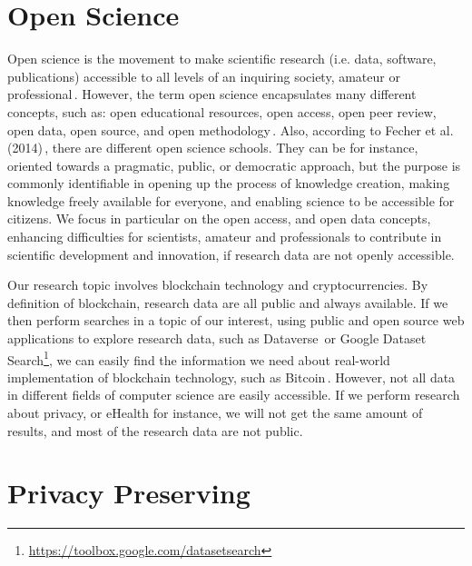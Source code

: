 
\section{Open Science}
Open science is the movement to make scientific research (i.e. data, software, publications)
accessible to all levels of an inquiring society, amateur or professional\,\cite{woelfle2011openscience}.
However, the term open science encapsulates many different concepts, such as: open educational resources,
open access, open peer review, open data, open source, and open methodology\,\cite{Knoth2015}.
%
Also, according to Fecher et al. (2014)\,\cite{Fecher2014}, there are different open science schools.
They can be for instance, oriented towards a pragmatic, public, or democratic approach, but
the purpose is commonly identifiable in opening up the process of knowledge creation,
making knowledge freely available for everyone, and enabling science to be accessible for citizens.
%
We focus in particular on the open access, and open data concepts, enhancing difficulties for
scientists, amateur and professionals to contribute in scientific development and innovation, if research data are not
openly accessible.

Our research topic involves blockchain technology and cryptocurrencies.
By definition of blockchain, research data are all
public and always available. If we then perform searches in a topic of our interest, using
public and open source web applications to explore research data, such as Dataverse\,\cite{crosas2011dataverse} or
Google Dataset Search\footnote{\url{https://toolbox.google.com/datasetsearch}}, we can
easily find the information we need about real-world implementation of blockchain
technology, such as Bitcoin\,\cite{nakamoto2009bitcoin}.
%
However, not all data in different fields of computer science
are easily accessible. If we perform research about privacy, or eHealth for instance,
we will not get the same amount of results, and most of the research data are not public.
%



\section{Privacy Preserving}




